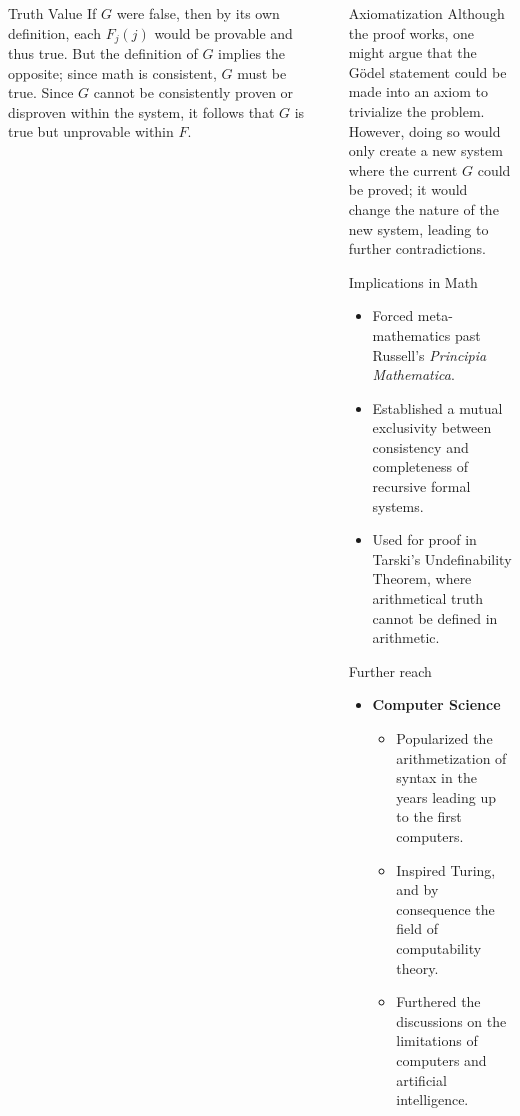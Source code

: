\documentclass[final]{beamer}
\newlength{\sepwidth}
\newlength{\colwidth}
\newcommand{\separatorcolumn}{\begin{column}{\sepwidth}\end{column}}
\begin{document}
\begin{frame}[t]
\begin{columns}[t]
\begin{column}{\colwidth}
 \begin{block}{Truth Value}
If $G$ were false, then by its own definition, each $F_j(j)$ would be provable and thus true. But the definition of $G$ implies the opposite; since math is consistent, $G$ must be true. Since $G$ cannot be consistently proven or disproven within the system, it follows that $G$ is true but unprovable within $F$.
 
 \end{block}

\end{column}


\separatorcolumn

\begin{column}{\colwidth}

\begin{block}{Axiomatization}
Although the proof works, one might argue that the Gödel statement could be made into an axiom to trivialize the problem.\\
However, doing so would only create a new system where the current $G$ could be proved; it would change the nature of the new system, leading to further contradictions.

\end{block}

\begin{block}{Implications in Math}

        \begin{itemize}
        
            \item Forced meta-mathematics past Russell's \textit{Principia Mathematica}.
            \item Established a mutual exclusivity between consistency and completeness of recursive formal systems.
            \item Used for proof in Tarski's Undefinability Theorem, where arithmetical truth cannot be defined in arithmetic.
            
        \end{itemize}
\end{block}


\begin{block}{Further reach}
    \begin{itemize}
      \item \textbf{Computer Science}
        \begin{itemize}

            \item Popularized the arithmetization of syntax in the years leading up to the first computers.
            \item Inspired Turing, and by consequence the field of computability theory.
            \item Furthered the discussions on the limitations of computers and artificial intelligence.
            

\end{itemize}
\end{itemize}
\end{block}
\end{column}
\end{columns}
\end{frame}
\end{document}
